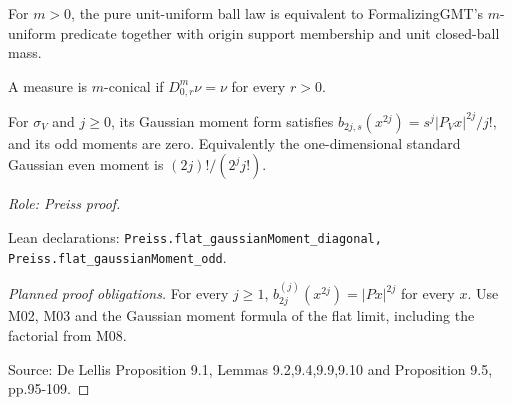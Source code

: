 \begin{lemma}
\label{lem:unit-uniform-adapter}








For $m>0$, the pure unit-uniform ball law is equivalent to FormalizingGMT's $m$-uniform predicate together with origin support membership and unit closed-ball mass.
\end{lemma}

\begin{definition}
\label{def:conical}










A measure is $m$-conical if $D^m_{0,r}\nu=\nu$ for every $r>0$.
\end{definition}

\begin{lemma}
\label{lem:flat-gaussian-even-moments}







For $\sigma_V$ and $j\geq0$, its Gaussian moment form satisfies $b_{2j,s}(x^{2j})=s^j|P_Vx|^{2j}/j!$, and its odd moments are zero. Equivalently the one-dimensional standard Gaussian even moment is $(2j)!/(2^j j!)$.
\par\emph{Role: Preiss proof.}
\par Lean declarations: \texttt{Preiss.flat\_gaussianMoment\_diagonal, Preiss.flat\_gaussianMoment\_odd}.
\end{lemma}
\begin{proof}[Planned proof obligations]

For every $j\geq1$, $b_{2j}^{(j)}(x^{2j})=|Px|^{2j}$ for every $x$.
Use M02, M03 and the Gaussian moment formula of the flat limit, including the
factorial from M08.
\par Source: De Lellis Proposition 9.1, Lemmas 9.2,9.4,9.9,9.10 and Proposition 9.5, pp.95-109.
\end{proof}


